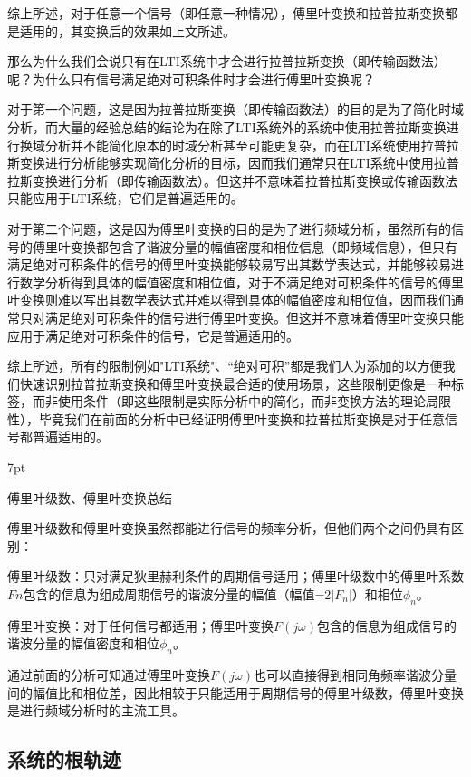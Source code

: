 \documentclass{article}
\numberwithin{equation}{section}
\numberwithin{figure}{section}
\newenvironment{formal}{%
\def\FrameCommand{%
\hspace{1pt}%
{\color{DarkBlue}\vrule width 2pt}%
{\color{formalshade}\vrule width 4pt}%
\colorbox{formalshade}%
}%
\MakeFramed{\advance\hsize-\width\FrameRestore}%
\noindent\hspace{-4.55pt}%
\begin{adjustwidth}{}{7pt}%
\vspace{2pt}\vspace{2pt}%
}
{%
\vspace{2pt}\end{adjustwidth}\endMakeFramed%
}
\begin{document}
    综上所述，对于任意一个信号（即任意一种情况），傅里叶变换和拉普拉斯变换都是适用的，其变换后的效果如上文所述。

    那么为什么我们会说只有在LTI系统中才会进行拉普拉斯变换（即传输函数法）呢？为什么只有信号满足绝对可积条件时才会进行傅里叶变换呢？

    对于第一个问题，这是因为拉普拉斯变换（即传输函数法）的目的是为了简化时域分析，而大量的经验总结的结论为在除了LTI系统外的系统中使用拉普拉斯变换进行换域分析并不能简化原本的时域分析甚至可能更复杂，而在LTI系统使用拉普拉斯变换进行分析能够实现简化分析的目标，因而我们通常只在LTI系统中使用拉普拉斯变换进行分析（即传输函数法）。但这并不意味着拉普拉斯变换或传输函数法只能应用于LTI系统，它们是普遍适用的。

    对于第二个问题，这是因为傅里叶变换的目的是为了进行频域分析，虽然所有的信号的傅里叶变换都包含了谐波分量的幅值密度和相位信息（即频域信息），但只有满足绝对可积条件的信号的傅里叶变换能够较易写出其数学表达式，并能够较易进行数学分析得到具体的幅值密度和相位值，对于不满足绝对可积条件的信号的傅里叶变换则难以写出其数学表达式并难以得到具体的幅值密度和相位值，因而我们通常只对满足绝对可积条件的信号进行傅里叶变换。但这并不意味着傅里叶变换只能应用于满足绝对可积条件的信号，它是普遍适用的。

    综上所述，所有的限制例如"LTI系统"、“绝对可积”都是我们人为添加的以方便我们快速识别拉普拉斯变换和傅里叶变换最合适的使用场景，这些限制更像是一种标签，而非使用条件（即这些限制是实际分析中的简化，而非变换方法的理论局限性），毕竟我们在前面的分析中已经证明傅里叶变换和拉普拉斯变换是对于任意信号都普遍适用的。

\begin{formal}
    傅里叶级数、傅里叶变换总结
\end{formal}

    傅里叶级数和傅里叶变换虽然都能进行信号的频率分析，但他们两个之间仍具有区别：

    傅里叶级数：只对满足狄里赫利条件的周期信号适用；傅里叶级数中的傅里叶系数$Fn$包含的信息为组成周期信号的谐波分量的幅值（幅值=2$|F_n|$）和相位$\phi_n$。

    傅里叶变换：对于任何信号都适用；傅里叶变换$F(j\omega)$包含的信息为组成信号的谐波分量的幅值密度和相位$\phi_n$。

    通过前面的分析可知通过傅里叶变换$F(j\omega)$也可以直接得到相同角频率谐波分量间的幅值比和相位差，因此相较于只能适用于周期信号的傅里叶级数，傅里叶变换是进行频域分析时的主流工具。

\subsection{系统的根轨迹}
\end{document}
